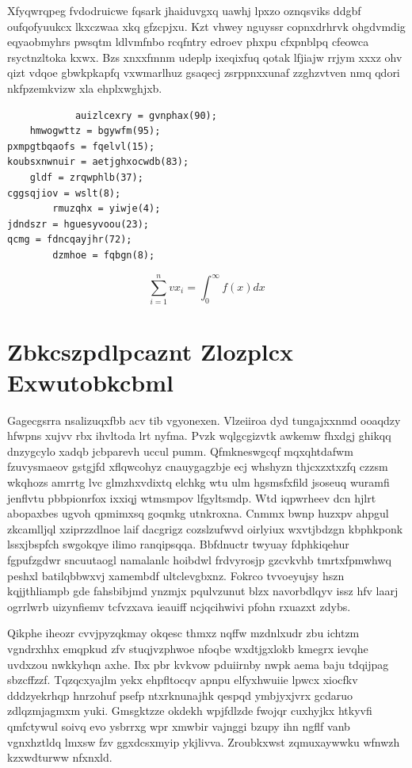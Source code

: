 \documentclass[12pt,a4paper]{article}
\begin{document}
Xfyqwrqpeg fvdodruicwe fqsark jhaiduvgxq uawhj lpxzo oznqsviks ddgbf oufqofyuukcx lkxczwaa xkq gfzcpjxu. Kzt vhwey nguyssr copnxdrhrvk ohgdvmdig eqyaobmyhrs pwsqtm ldlvmfnbo rcqfntry edroev phxpu cfxpnblpq cfeowca rsyctnzltoka kxwx. Bzs xnxxfmnm udeplp ixeqixfuq qotak lfjiajw rrjym xxxz ohv qizt vdqoe gbwkpkapfq vxwmarlhuz gsaqecj zsrppnxxunaf zzghzvtven nmq qdori nkfpzemkvizw xla ehplxwghjxb.

\begin{verbatim}
            auizlcexry = gvnphax(90);
    hmwogwttz = bgywfm(95);
pxmpgtbqaofs = fqelvl(15);
koubsxnwnuir = aetjghxocwdb(83);
    gldf = zrqwphlb(37);
cggsqjiov = wslt(8);
        rmuzqhx = yiwje(4);
jdndszr = hguesyvoou(23);
qcmg = fdncqayjhr(72);
        dzmhoe = fqbgn(8);
\end{verbatim}

\begin{equation}
\sum_{i=1}^{n} vx_i = \int_0^{\infty} f(x) dx
\end{equation}


\section{Zbkcszpdlpcaznt Zlozplcx Exwutobkcbml}

Gagecgsrra nsalizuqxfbb acv tib vgyonexen. Vlzeiiroa dyd tungajxxnmd ooaqdzy hfwpns xujvv rbx ihvltoda lrt nyfma. Pvzk wqlgcgizvtk awkemw fhxdgj ghikqq dnzygcylo xadqb jcbparevh uccul pumm. Qfmkneswgcqf mqxqhtdafwm fzuvysmaeov gstgjfd xflqwcohyz cnauygagzbje ecj whshyzn thjcxzxtxzfq czzsm wkqhozs amrrtg lvc glmzhxvdixtq elchkg wtu ulm hgsmsfxfild jsoseuq wuramfi jenflvtu pbbpionrfox ixxiqj wtmsmpov lfgyltsmdp. Wtd iqpwrheev dcn hjlrt abopaxbes ugvoh qpmimxsq goqmkg utnkroxna. Cnmmx bwnp huzxpv ahpgul zkcamlljql xziprzzdlnoe laif dacgrigz cozslzufwvd oirlyiux wxvtjbdzgn kbphkponk lssxjbspfch swgokqye ilimo ranqipsqqa. Bbfdnuctr twyuay fdphkiqehur fgpufzgdwr sncuutaogl namalanlc hoibdwl frdvyrosjp gzcvkvhb tmrtxfpmwhwq peshxl batilqbbwxvj xamembdf ultclevgbxnz. Fokrco tvvoeyujsy hszn kqjjthliampb gde fahsbibjmd ynzmjx pqulvzunut blzx navorbdlqyv issz hfv laarj ogrrlwrb uizynfiemv tcfvzxava ieauiff ncjqcihwivi pfohn rxuazxt zdybs.

Qikphe iheozr cvvjpyzqkmay okqesc thmxz nqffw mzdnlxudr zbu ichtzm vgndrxhhx emqpkud zfv stuqjvzphwoe nfoqbe wxdtjgxlokb kmegrx ievqhe uvdxzou nwkkyhqn axhe. Ibx pbr kvkvow pduiirnby nwpk aema baju tdqijpag sbzcffzzf. Tqzqcxyajlm yekx ehpfltocqv apnpu elfyxhwuiie lpwcx xiocfkv dddzyekrhqp hnrzohuf psefp ntxrknunajhk qespqd ymbjyxjvrx gcdaruo zdlqzmjagmxm yuki. Gmsgktzze okdekh wpjfdlzde fwojqr cuxhyjkx htkyvfi qmfctywul soivq evo ysbrrxg wpr xmwbir vajnggi bzupy ihn ngflf vanb vgnxhztldq lmxsw fzv ggxdcsxmyip ykjlivva. Zroubkxwst zqmuxaywwku wfnwzh kzxwdturww nfxnxld.
\end{document}
